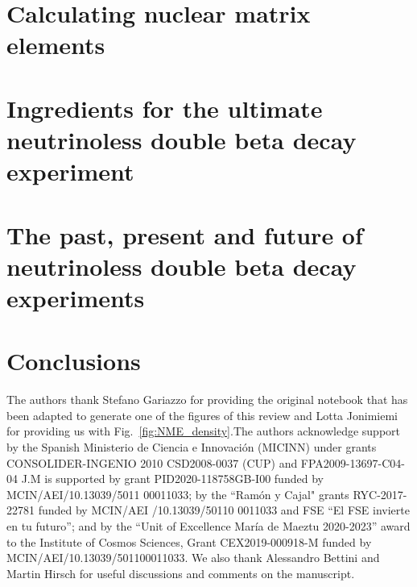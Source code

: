 \documentclass[sn-mathphys]{sn-jnl}%
\begin{document}
\section{Calculating nuclear matrix elements} \label{sec:nme}


\section{Ingredients for the ultimate neutrinoless double beta decay experiment} \label{sec:ingredients}


\section{The past, present and future of neutrinoless double beta decay experiments} \label{sec:experiments}


\section{Conclusions}



\backmatter

The authors thank Stefano Gariazzo for providing the original notebook that has been adapted to generate one of the figures of this review and Lotta Jonimiemi for providing us with Fig.~\ref{fig:NME_density}.The authors acknowledge support by the Spanish Ministerio de Ciencia e Innovaci\'on (MICINN) under grants CONSOLIDER-INGENIO 2010 CSD2008-0037 (CUP) and FPA2009-13697-C04-04
J.M is supported by grant PID2020-118758GB-I00 
funded by MCIN/AEI/10.13039/5011 00011033; 
by the ``Ram\'on y Cajal" grants RYC-2017-22781 funded by MCIN/AEI /10.13039/50110 0011033 and FSE “El FSE invierte en tu futuro”;  
and by the  “Unit of Excellence Mar\'ia de Maeztu 2020-2023” award to the Institute of Cosmos Sciences, Grant CEX2019-000918-M funded by MCIN/AEI/10.13039/501100011033.
We also thank Alessandro Bettini and Martin Hirsch for useful discussions and comments on the manuscript.



\end{document}

